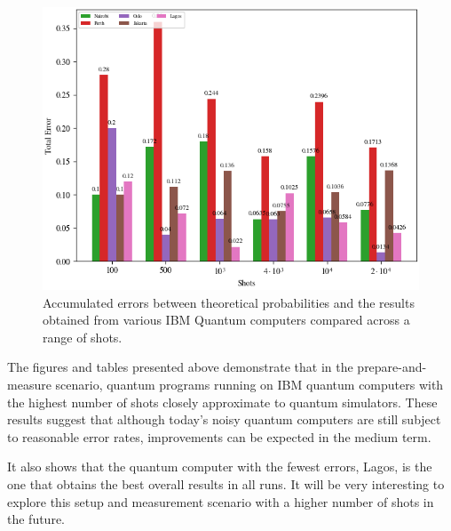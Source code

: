\begin{figure}[h!]
\centering
\includegraphics[width=\textwidth]{images/quantum_benchmark_total_error.png}
\caption{Accumulated errors between theoretical probabilities and the results obtained from various IBM Quantum computers compared across a range of shots.}
\label{fig:quantum_benchmark_total_error}
\end{figure}
\clearpage
The figures and tables presented above demonstrate that in the prepare-and-measure scenario, quantum programs running on IBM quantum computers with the highest number of shots closely approximate to quantum simulators. These results suggest that although today's noisy quantum computers are still subject to reasonable error rates, improvements can be expected in the medium term. 

It also shows that the quantum computer with the fewest errors, Lagos, is the one that obtains the best overall results in all runs. It will be very interesting to explore this setup and measurement scenario with a higher number of shots in the future.
